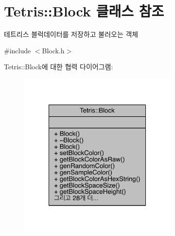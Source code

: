 \hypertarget{class_tetris_1_1_block}{}\section{Tetris\+:\+:Block 클래스 참조}
\label{class_tetris_1_1_block}


테트리스 블럭데이터를 저장하고 불러오는 객체  




{\ttfamily \#include $<$Block.\+h$>$}



Tetris\+:\+:Block에 대한 협력 다이어그램\+:
\nopagebreak
\begin{figure}[H]
\begin{center}
\leavevmode
\includegraphics[width=228pt]{class_tetris_1_1_block__coll__graph}
\end{center}
\end{figure}
